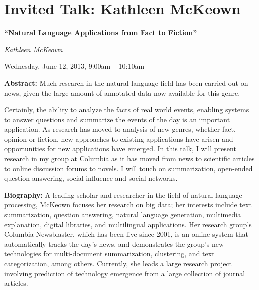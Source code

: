\section{Invited Talk: Kathleen McKeown}
\begin{center}

\begin{Large}
{\bfseries\Large ``Natural Language Applications from Fact to Fiction''}\vspace{1em}\par
\end{Large}

{\itshape Kathleen McKeown}\vspace{1em}\par
Wednesday, June 12, 2013, 9:00am -- 10:10am \vspace{1em}\\
\PlenaryLoc
\end{center}

\noindent
{\bfseries Abstract:} Much research in the natural language field has been carried out on news, given the large amount of annotated data now available for this genre.

Certainly, the ability to analyze the facts of real world events, enabling systems to answer questions and summarize the events of the day is an important application. As research has moved to analysis of new genres, whether fact, opinion or fiction, new approaches to existing applications have arisen and opportunities for new applications have emerged. In this talk, I will present research in my group at Columbia as it has moved from news to scientific articles to online discussion forums to novels. I will touch on summarization, open-ended question answering, social influence and social networks.

\vspace{3em}\par 

\vfill
\noindent
{\bfseries Biography:} A leading scholar and researcher in the field of natural language processing,
McKeown focuses her research on big data; her interests include text summarization, question
answering, natural language generation, multimedia explanation, digital libraries, and multilingual
applications. Her research group's Columbia Newsblaster, which has been live since 2001, is an
online system that automatically tracks the day's news, and demonstrates the group's new
technologies for multi-document summarization, clustering, and text categorization, among
others. Currently, she leads a large research project involving prediction of technology emergence
from a large collection of journal articles.

